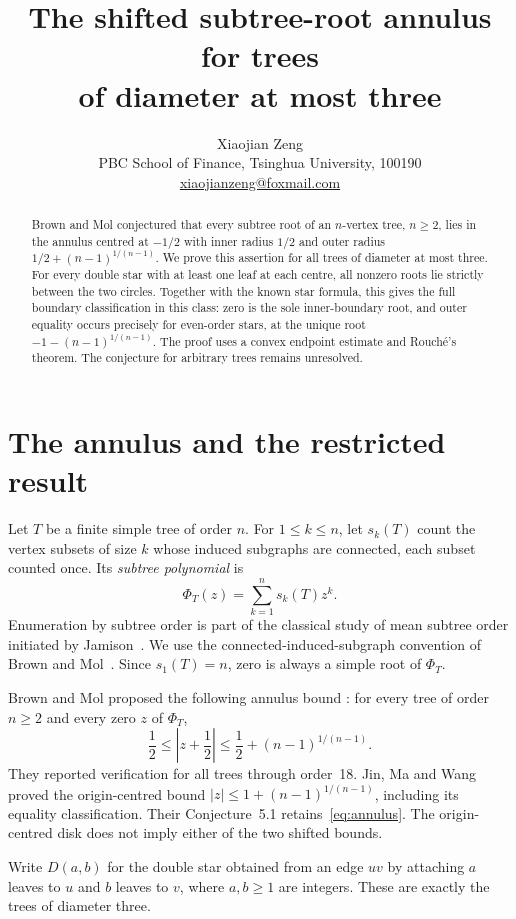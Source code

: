 \documentclass[11pt]{article}
\title{The shifted subtree-root annulus for trees\\of diameter at most three}
\author{Xiaojian Zeng\\[3pt]
\small PBC School of Finance, Tsinghua University, 100190\\
\small \href{mailto:xiaojianzeng@foxmail.com}{xiaojianzeng@foxmail.com}}
\date{}
\newcommand{\abs}[1]{\left|#1\right|}
\begin{document}
\maketitle
\begin{abstract}
Brown and Mol conjectured that every subtree root of an $n$-vertex tree,
$n\geq2$, lies in the annulus centred at $-1/2$ with inner radius $1/2$
and outer radius $1/2+(n-1)^{1/(n-1)}$.
We prove this assertion for all trees of diameter at most three.
For every double star with at least one leaf at each centre, all nonzero
roots lie strictly between the two circles. Together with the known star
formula, this gives the full boundary classification in this class:
zero is the sole inner-boundary root, and outer equality occurs precisely
for even-order stars, at the unique root $-1-(n-1)^{1/(n-1)}$.
The proof uses a convex endpoint estimate and Rouch\'e's theorem.
The conjecture for arbitrary trees remains unresolved.
\end{abstract}

\section{The annulus and the restricted result}

Let $T$ be a finite simple tree of order $n$. For $1\leq k\leq n$, let
$s_k(T)$ count the vertex subsets of size $k$ whose induced subgraphs are
connected, each subset counted once. Its \emph{subtree polynomial} is
\[
 \Phi_T(z)=\sum_{k=1}^n s_k(T)z^k.
\]
Enumeration by subtree order is part of the classical study of mean
subtree order initiated by Jamison~\cite{Jamison1983}.
We use the connected-induced-subgraph convention of
Brown and Mol~\cite{BrownMol2020}. Since $s_1(T)=n$, zero is always
a simple root of $\Phi_T$.

Brown and Mol proposed the following annulus bound
\cite[Conjecture~4.2 in the preprint version]{BrownMol2020}:
for every tree of order $n\geq2$ and every zero $z$ of $\Phi_T$,
\begin{equation}\label{eq:annulus}
 \frac12\leq\abs{z+\frac12}\leq\frac12+(n-1)^{1/(n-1)}.
\end{equation}
They reported verification for all trees through order~18.
Jin, Ma and Wang~\cite[Theorem~1.3]{JinMaWang2026} proved the
origin-centred bound $|z|\leq1+(n-1)^{1/(n-1)}$, including its equality
classification. Their Conjecture~5.1 retains~\eqref{eq:annulus}.
The origin-centred disk does not imply either of the two shifted bounds.

Write $D(a,b)$ for the double star obtained from an edge $uv$ by attaching
$a$ leaves to $u$ and $b$ leaves to $v$, where $a,b\geq1$ are integers.
These are exactly the trees of diameter three.
\end{document}
